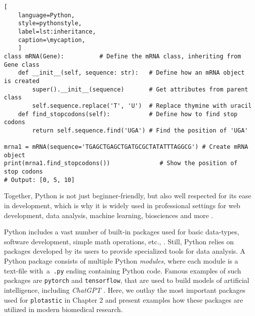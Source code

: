 \def\mycaption{ Example of inheritance in Python.
    The class ``\texttt{mRNA}'' inherits from the class ``\texttt{Gene}''. The class
    ``\texttt{mRNA}'' has two methods, ``\texttt{\_\_init\_\_}'' and
    ``\texttt{find\_stopcodon}''. The method ``\texttt{find\_stopcodon}'' finds the
    position of stop codons. }
\begin{lstlisting}[
    language=Python,
    style=pythonstyle,
    label=lst:inheritance,
    caption=\mycaption,
    ]
class mRNA(Gene):          # Define the mRNA class, inheriting from Gene class
    def __init__(self, sequence: str):   # Define how an mRNA object is created
        super().__init__(sequence)       # Get attributes from parent class
        self.sequence.replace('T', 'U')  # Replace thymine with uracil
    def find_stopcodons(self):           # Define how to find stop codons
        return self.sequence.find('UGA') # Find the position of 'UGA'

mrna1 = mRNA(sequence='TGAGCTGAGCTGATGCGCTATATTTAGGCG') # Create mRNA object
print(mrna1.find_stopcodons())              # Show the position of stop codons
# Output: [0, 5, 10]
\end{lstlisting}


Together, Python is not just beginner-friendly, but also well respected for its
ease in development, which is why it is widely used in professional settings for
web development, data analysis, machine learning, biosciences and more
\cite{ekmekciIntroductionProgrammingBioscientists2016,rayhanRisePythonSurvey2023}.

%
\label{sec:python_packages}%
Python includes a vast number of built-in packages used for basic data-types,
software development, simple math operations, etc.,
\cite{PythonLanguageReference2024}. Still, Python relies on packages developed
by its users to provide specialized tools for data analysis. A Python package
consists of multiple Python \emph{modules}, where each module is a text-file
with~a~\texttt{.py} ending containing Python code. Famous examples of such
packages are \texttt{pytorch} and \texttt{tensorflow}, that are used to build
models of artificial intelligence, including \textit{ChatGPT}
\cite{paszkePyTorchImperativeStyle2019, abadiTensorFlowLargeScaleMachine2016,
    radfordLanguageModelsAre2019}. Here, we outlay the most important packages used
for \texttt{plotastic} in Chapter 2 and present examples how these packages are
utilized in modern biomedical research.

